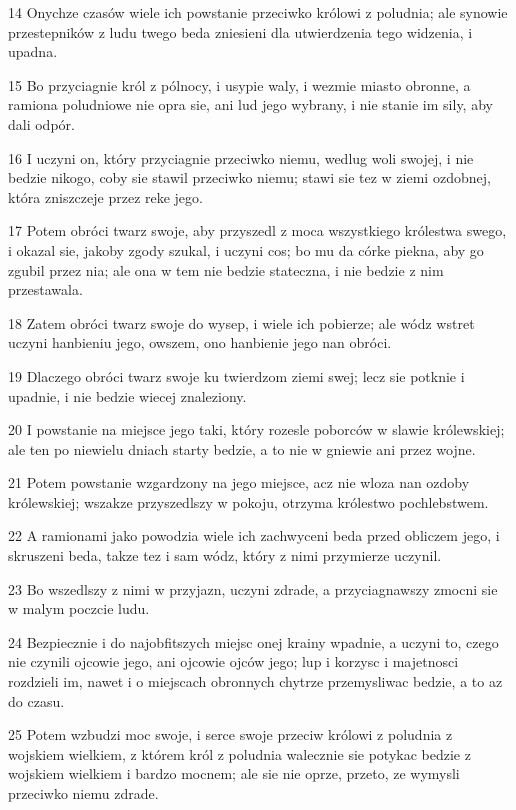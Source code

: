 \par 14 Onychze czasów wiele ich powstanie przeciwko królowi z poludnia; ale synowie przestepników z ludu twego beda zniesieni dla utwierdzenia tego widzenia, i upadna.
\par 15 Bo przyciagnie król z pólnocy, i usypie waly, i wezmie miasto obronne, a ramiona poludniowe nie opra sie, ani lud jego wybrany, i nie stanie im sily, aby dali odpór.
\par 16 I uczyni on, który przyciagnie przeciwko niemu, wedlug woli swojej, i nie bedzie nikogo, coby sie stawil przeciwko niemu; stawi sie tez w ziemi ozdobnej, która zniszczeje przez reke jego.
\par 17 Potem obróci twarz swoje, aby przyszedl z moca wszystkiego królestwa swego, i okazal sie, jakoby zgody szukal, i uczyni cos; bo mu da córke piekna, aby go zgubil przez nia; ale ona w tem nie bedzie stateczna, i nie bedzie z nim przestawala.
\par 18 Zatem obróci twarz swoje do wysep, i wiele ich pobierze; ale wódz wstret uczyni hanbieniu jego, owszem, ono hanbienie jego nan obróci.
\par 19 Dlaczego obróci twarz swoje ku twierdzom ziemi swej; lecz sie potknie i upadnie, i nie bedzie wiecej znaleziony.
\par 20 I powstanie na miejsce jego taki, który rozesle poborców w slawie królewskiej; ale ten po niewielu dniach starty bedzie, a to nie w gniewie ani przez wojne.
\par 21 Potem powstanie wzgardzony na jego miejsce, acz nie wloza nan ozdoby królewskiej; wszakze przyszedlszy w pokoju, otrzyma królestwo pochlebstwem.
\par 22 A ramionami jako powodzia wiele ich zachwyceni beda przed obliczem jego, i skruszeni beda, takze tez i sam wódz, który z nimi przymierze uczynil.
\par 23 Bo wszedlszy z nimi w przyjazn, uczyni zdrade, a przyciagnawszy zmocni sie w malym poczcie ludu.
\par 24 Bezpiecznie i do najobfitszych miejsc onej krainy wpadnie, a uczyni to, czego nie czynili ojcowie jego, ani ojcowie ojców jego; lup i korzysc i majetnosci rozdzieli im, nawet i o miejscach obronnych chytrze przemysliwac bedzie, a to az do czasu.
\par 25 Potem wzbudzi moc swoje, i serce swoje przeciw królowi z poludnia z wojskiem wielkiem, z którem król z poludnia walecznie sie potykac bedzie z wojskiem wielkiem i bardzo mocnem; ale sie nie oprze, przeto, ze wymysli przeciwko niemu zdrade.
